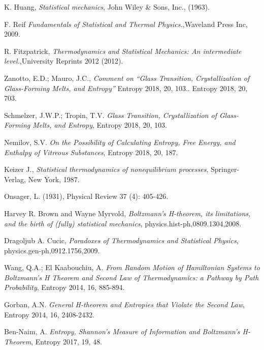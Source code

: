\documentclass{article}
\begin{document}
\begin{thebibliography}{}


K. Huang, \emph{Statistical mechanics}, John Wiley \& Sons, Inc., (1963).

F. Reif {\it Fundamentals of Statistical and Thermal Physics.},Waveland Press Inc, 2009.

R. Fitzpatrick, {\it Thermodynamics and Statistical Mechanics: An intermediate level.},University Reprints 2012 (2012).

Zanotto, E.D.; Mauro, J.C., {\it Comment on “Glass Transition, Crystallization of Glass-Forming Melts, and Entropy”} Entropy 2018, 20, 103.. Entropy 2018, 20, 703.

Schmelzer, J.W.P.; Tropin, T.V. {\it Glass Transition, Crystallization of Glass-Forming Melts, and Entropy}, Entropy 2018, 20, 103.

Nemilov, S.V. {\it On the Possibility of Calculating Entropy, Free Energy, and Enthalpy of Vitreous Substances}, Entropy 2018, 20, 187.

Keizer J., \emph{Statistical thermodynamics of nonequilibrium processes}, Springer-Verlag, New York, 1987.

Onsager, L. (1931), Physical Review 37 (4): 405-426.

Harvey R. Brown and Wayne Myrvold, {\it Boltzmann's H-theorem, its limitations, and the birth of (fully) statistical mechanics}, physics.hist-ph,0809.1304,2008.

Dragoljub A. Cucic, {\it Paradoxes of Thermodynamics and Statistical Physics}, physics.gen-ph,0912.1756,2009.

Wang, Q.A.; El Kaabouchiu, A. {\it From Random Motion of Hamiltonian Systems to Boltzmann’s H Theorem and Second Law of Thermodynamics: a Pathway by Path Probability}, Entropy 2014, 16, 885-894.

Gorban, A.N. {\it General H-theorem and Entropies that Violate the Second Law}, Entropy 2014, 16, 2408-2432.

Ben-Naim, A. {\it Entropy, Shannon’s Measure of Information and Boltzmann’s H-Theorem}, Entropy 2017, 19, 48.


\end{thebibliography}
\end{document}
